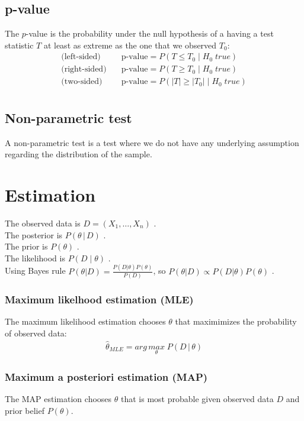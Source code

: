 \documentclass[../main.tex]{subfiles}
\begin{document}
\subsection{p-value}
The $p$-value is the probability under the null hypothesis of a having a test statistic $T$ at
least as extreme as the one that we observed $T_0$:
\begin{align*}
    \text{(left-sided)} \quad & \text{p-value} = P(T \leq T_0\; |\; H_0\; true) \\
    \text{(right-sided)}\quad & \text{p-value} = P(T \geq T_0\; |\; H_0\; true) \\
    \text{(two-sided)}  \quad & \text{p-value} = P(|T| \geq |T_0|\; |\; H_0\; true) \\
\end{align*}

\subsection{Non-parametric test}
A non-parametric test is a test where we do not have any underlying assumption regarding the
distribution of the sample.

\section{Estimation}
The observed data is $D = (X_1, \dots, X_n)$ . \\
The posterior is $P(\theta\, | \, D)$ . \\
The prior is $P(\theta)$ . \\
The likelihood is $P(D\; |\; \theta)$ . \\
Using Bayes rule $P(\theta | D) = \frac{P(D|\theta)P(\theta)}{P(D)}$,
so $P(\theta | D) \propto P(D|\theta)P(\theta)$ .

\subsubsection{Maximum likelhood estimation (MLE)}
 The maximum likelihood estimation chooses $\theta$ that maximimizes the probability of observed data:
\begin{align*}
    \hat{\theta}_{MLE} = arg\,\underset{\theta}{max}\; P(D\,|\, \theta)
\end{align*}

\subsubsection{Maximum a posteriori estimation (MAP)}
The MAP estimation chooses $\theta$ that is most probable given observed data $D$ and prior belief
$P(\theta)$. \\
\end{document}
